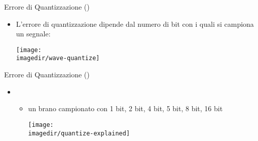 %
%
%
%
\setcounter{ms}{1}
\begin{slide}{Errore di Quantizzazione ()}

	\begin{itemize}

		\item L'errore di quantizzazione dipende
		      dal numero di bit con i quali si
			  campiona un segnale:

			  \begin{center}
				\texttt{[image: \\imagedir/wave-quantize]}
			  \end{center}

	\end{itemize}

\end{slide}

\begin{slide}{Errore di Quantizzazione ()}

	\begin{itemize}

		\item {}

		\begin{itemize}

			\item un brano campionato con 1 bit,
			      2 bit, 4 bit, 5 bit, 8 bit, 16 bit

				\begin{center}
					\texttt{[image: \\imagedir/quantize-explained]}
				\end{center}

		\end{itemize}

	\end{itemize}

\end{slide}
